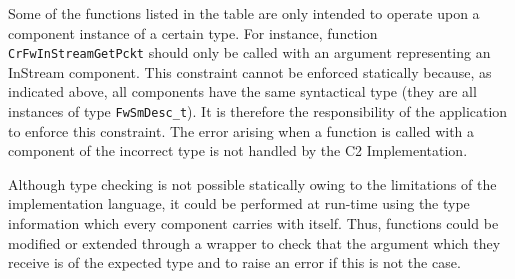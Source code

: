 \documentclass{pnp_article}
\begin{document}
Some of the functions listed in the table are only intended to operate upon a component instance of a certain type. For instance, function \texttt{CrFwInStreamGetPckt} should only be called with an argument representing an InStream component. This constraint cannot be enforced statically because, as indicated above, all components have the same syntactical type (they are all instances of type \texttt{FwSmDesc\_t}). It is therefore the responsibility of the application to enforce this constraint. The error arising when a function is called with a component of the incorrect type is not handled by the C2 Implementation. 

Although type checking is not possible statically owing to the limitations of the implementation language, it could be performed at run-time using the type information which every component carries with itself. Thus, functions could be modified or extended through a wrapper to check that the argument which they receive is of the expected type and to raise an error if this is not the case. 
\end{document}
